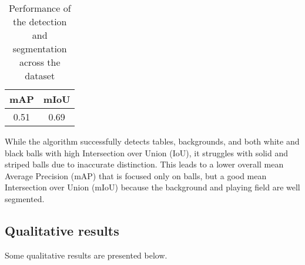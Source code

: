 \begin{table}[H]
	\centering
	\begin{tabular}{|c|c|}
		\hline
		\textbf{mAP} & \textbf{mIoU} \\
		\hline
		0.51 & 0.69 \\
		\hline
	\end{tabular}
	\caption{Performance of the detection and segmentation across the dataset}
	\label{tab: performance across dataset}
\end{table}


While the algorithm successfully detects tables, backgrounds, and both white and black balls with high Intersection over Union (IoU), it struggles with solid and striped balls due to inaccurate distinction. %
This leads to a lower overall mean Average Precision (mAP) that is focused only on balls, but a good mean Intersection over Union (mIoU) because the background and playing field are well segmented.

\subsection{Qualitative results}
Some qualitative results are presented below.



